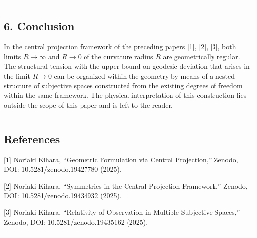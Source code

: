 \documentclass[a4paper,11pt]{article}
\theoremstyle{definition}
\begin{document}
\begin{center}\rule{0.5\linewidth}{0.5pt}\end{center}

\subsection{6. Conclusion}\label{conclusion}

In the central projection framework of the preceding papers {[}1{]}, {[}2{]}, {[}3{]}, both limits \(R \to \infty\) and \(R \to 0\) of the curvature radius \(R\) are geometrically regular. The structural tension with the upper bound on geodesic deviation that arises in the limit \(R \to 0\) can be organized within the geometry by means of a nested structure of subjective spaces constructed from the existing degrees of freedom within the same framework. The physical interpretation of this construction lies outside the scope of this paper and is left to the reader.

\begin{center}\rule{0.5\linewidth}{0.5pt}\end{center}

\subsection{References}\label{references}

{[}1{]} Noriaki Kihara, ``Geometric Formulation via Central Projection,'' Zenodo, DOI: 10.5281/zenodo.19427780 (2025).

{[}2{]} Noriaki Kihara, ``Symmetries in the Central Projection Framework,'' Zenodo, DOI: 10.5281/zenodo.19434932 (2025).

{[}3{]} Noriaki Kihara, ``Relativity of Observation in Multiple Subjective Spaces,'' Zenodo, DOI: 10.5281/zenodo.19435162 (2025).

\begin{center}\rule{0.5\linewidth}{0.5pt}\end{center}
\end{document}

